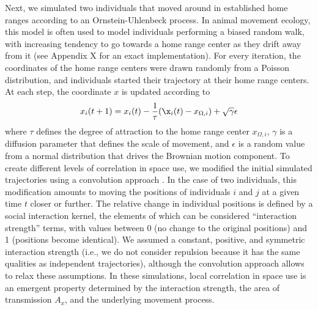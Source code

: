 ﻿\documentclass[11pt]{article}
\begin{document}
Next, we simulated two individuals that moved around in established home ranges according to an Ornstein-Uhlenbeck process. In animal movement ecology, this model is often used to model individuals performing a biased random walk, with increasing tendency to go towards a home range center as they drift away from it (see Appendix X for an exact implementation). For every iteration, the coordinates of the home range centers were drawn randomly from a Poisson distribution, and individuals started their trajectory at their home range centers. At each step, the coordinate $x$ is updated according to 
\begin{equation}
	x_i(t+1)=x_i(t)-\frac{1}{\tau}(\x_i(t)-x_{\Omega,i})+\sqrt{\gamma}\epsilon
\end{equation}
where $\tau$ defines the degree of attraction to the home range center $x_{\Omega,i}$, $\gamma$ is a diffusion parameter that defines the scale of movement, and $\epsilon$ is a random value from a normal distribution that drives the Brownian motion component. To create different levels of correlation in space use, we modified the initial simulated trajectories using a convolution approach \citep{Scharf2018}. In the case of two individuals, this modification amounts to moving the positions of individuals $i$ and $j$ at a given time $t$ closer or further. The relative change in individual positions is defined by a social interaction kernel, the elements of which can be considered ``interaction strength'' terms, with values between 0 (no change to the original positions) and 1 (positions become identical). We assumed a constant, positive, and symmetric interaction strength (i.e., we do not consider repulsion because it has the same qualities as independent trajectories), although the convolution approach allows to relax these assumptions. In these simulations, local correlation in space use is an emergent property determined by the interaction strength, the area of transmission $A_x$, and the underlying movement process.  
\end{document}
